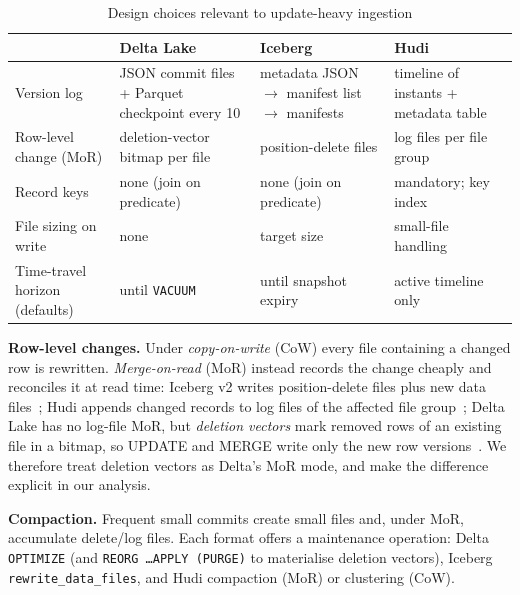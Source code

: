 \documentclass[conference]{IEEEtran}
\begin{document}
\begin{table}[t]
\centering\caption{Design choices relevant to update-heavy ingestion}\label{tab:design}
\footnotesize
\begin{tabular}{@{}p{1.55cm}p{1.95cm}p{1.95cm}p{1.95cm}@{}}\toprule
 & Delta Lake & Iceberg & Hudi\\\midrule
Version log & JSON commit files + Parquet checkpoint every 10 & metadata JSON $\rightarrow$ manifest list $\rightarrow$ manifests & timeline of instants + metadata table\\
Row-level change (MoR) & deletion-vector bitmap per file & position-delete files & log files per file group\\
Record keys & none (join on predicate) & none (join on predicate) & mandatory; key index\\
File sizing on write & none & target size & small-file handling\\
Time-travel horizon (defaults) & until \texttt{VACUUM} & until snapshot expiry & active timeline only\\\bottomrule
\end{tabular}
\end{table}

\textbf{Row-level changes.} Under \emph{copy-on-write} (CoW) every file containing a changed row is rewritten.
\emph{Merge-on-read} (MoR) instead records the change cheaply and reconciles it at read time: Iceberg v2 writes
position-delete files plus new data files~\cite{iceberg-spec}; Hudi appends changed records to log files of the
affected file group~\cite{hudi-docs}; Delta Lake has no log-file MoR, but \emph{deletion vectors} mark removed rows of
an existing file in a bitmap, so UPDATE and MERGE write only the new row versions~\cite{delta-dv}. We therefore
treat deletion vectors as Delta's MoR mode, and make the difference explicit in our analysis.

\textbf{Compaction.} Frequent small commits create small files and, under MoR, accumulate delete/log files.
Each format offers a maintenance operation: Delta \texttt{OPTIMIZE} (and \texttt{REORG \dots APPLY (PURGE)} to
materialise deletion vectors), Iceberg \texttt{rewrite\_data\_files}, and Hudi compaction (MoR) or clustering (CoW).
\end{document}
